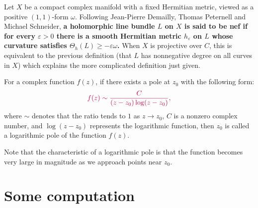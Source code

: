 \documentclass[twoside,openany,12pt]{beautynote}
\begin{document}
\begin{definition}\label{def:Metric definition of nef line bundles}
Let $X$ be a compact complex manifold with a fixed Hermitian metric, viewed as a positive $(1,1)$-form $\omega$. Following Jean-Pierre Demailly, Thomas Peternell and Michael Schneider, \textbf{\color{purple} a holomorphic line bundle $L$ on $X$ is said to be nef if for every $\varepsilon>0$ there is a smooth Hermitian metric $h_\varepsilon$ on $L$ whose curvature satisfies $\Theta_h(L) \geqslant-\varepsilon \omega$.} When $X$ is projective over $C$, this is equivalent to the previous definition (that $L$ has nonnegative degree on all curves in $X$) which explains the more complicated definition just given. 
\end{definition}
    \begin{definition}\label{def:logarithmic pole}
        For a complex function $f(z)$, if there exists a pole at $z_0$ with the following form:
        \[\color{purple} f(z)\sim \frac{C}{(z-z_0)\log (z-z_0)},\]
        where $\sim$ denotes that the ratio tends to $1$ as $z\to z_0$, $C$ is a nonzero complex number, and $\log(z-z_0)$ represents the logarithmic function, then $z_0$ is called a logarithmic pole of the function $f(z)$.

        Note that the characteristic of a logarithmic pole is that the function becomes very large in magnitude as we approach points near $z_0$.
    \end{definition}



\section{Some computation}
\end{document}
